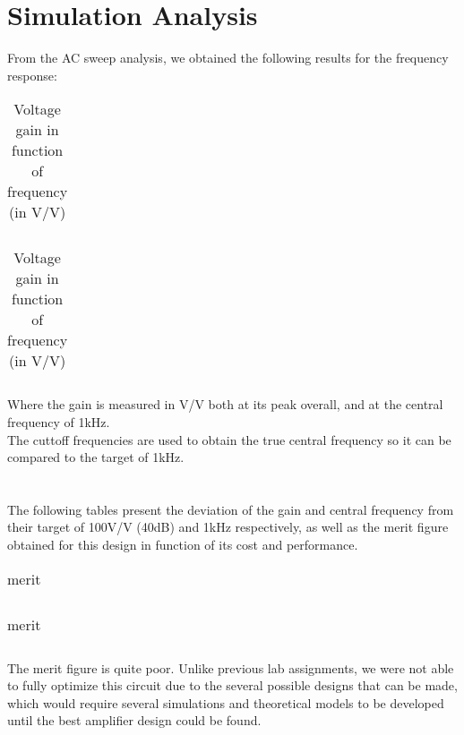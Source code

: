 \section{Simulation Analysis}
\label{sec:simulation} 

From the AC sweep analysis, we obtained the following results for the frequency response:


\begin{table}[!htb]
  \parbox{.45\linewidth}{
    \centering
    \begin{tabular}{|l|l|}
      \hline
      
    \end{tabular}
    \caption{Lower and upper cutoff frequencies plus central frequency (in Hertz)}
  }
\hfill
  \parbox{0.45\linewidth}{
    \centering
    \begin{tabular}{|l|l|}
      \hline    
      
    \end{tabular}
    \caption{Voltage gain in function of frequency (in V/V)}
  }
\end{table}

Where the gain is measured in V/V both at its peak overall, and at the central frequency of 1kHz.\\
The cuttoff frequencies are used to obtain the true central frequency so it can be compared to the target of 1kHz.\\ \\ \\

The following tables present the deviation of the gain and central frequency from their target of 100V/V (40dB) and 1kHz respectively, as well as the merit figure obtained for this design in function of its cost and performance.
\begin{table}[!htb]
\parbox{.45\linewidth}{
\centering
\begin{tabular}{|l|l|}
    \hline    
    
  \end{tabular}
  \caption{deviations}
}
\hfill
\parbox{.45\linewidth}{
\centering
\begin{tabular}{|l|l|}
    \hline    
    
  \end{tabular}
  \caption{merit}
  \label{tab:Spice1}
}
\end{table}

The merit figure is quite poor. Unlike previous lab assignments, we were not able to fully optimize this circuit due to the several possible designs that can be made, which would require several simulations and theoretical models to be developed until the best amplifier design could be found.\\ \\ \\

